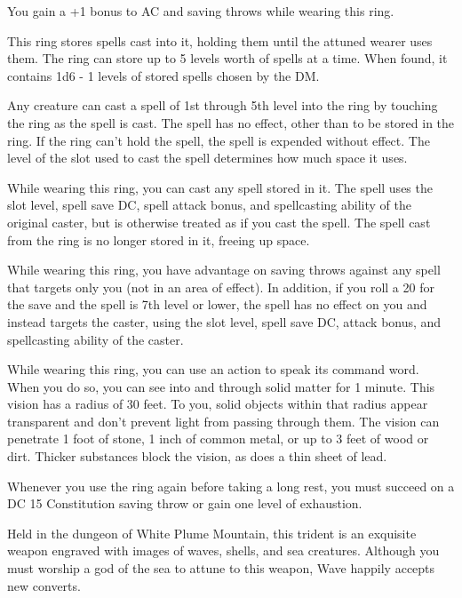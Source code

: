 \documentclass[10pt,a4paper,twoside,bg=print,twocolumn,openany,nodeprecatedcode]{dndbook}
\begin{document}
You gain a +1 bonus to AC and saving throws while wearing this ring.

This ring stores spells cast into it, holding them until the attuned wearer uses them. The ring can store up to 5 levels worth of spells at a time. When found, it contains 1d6 - 1 levels of stored spells chosen by the DM.

Any creature can cast a spell of 1st through 5th level into the ring by touching the ring as the spell is cast. The spell has no effect, other than to be stored in the ring. If the ring can't hold the spell, the spell is expended without effect. The level of the slot used to cast the spell determines how much space it uses.

While wearing this ring, you can cast any spell stored in it. The spell uses the slot level, spell save DC, spell attack bonus, and spellcasting ability of the original caster, but is otherwise treated as if you cast the spell. The spell cast from the ring is no longer stored in it, freeing up space.

While wearing this ring, you have advantage on saving throws against any spell that targets only you (not in an area of effect). In addition, if you roll a 20 for the save and the spell is 7th level or lower, the spell has no effect on you and instead targets the caster, using the slot level, spell save DC, attack bonus, and spellcasting ability of the caster.

While wearing this ring, you can use an action to speak its command word. When you do so, you can see into and through solid matter for 1 minute. This vision has a radius of 30 feet. To you, solid objects within that radius appear transparent and don't prevent light from passing through them. The vision can penetrate 1 foot of stone, 1 inch of common metal, or up to 3 feet of wood or dirt. Thicker substances block the vision, as does a thin sheet of lead.

Whenever you use the ring again before taking a long rest, you must succeed on a DC 15 Constitution saving throw or gain one level of exhaustion.

Held in the dungeon of White Plume Mountain, this trident is an exquisite weapon engraved with images of waves, shells, and sea creatures. Although you must worship a god of the sea to attune to this weapon, Wave happily accepts new converts.
\end{document}
